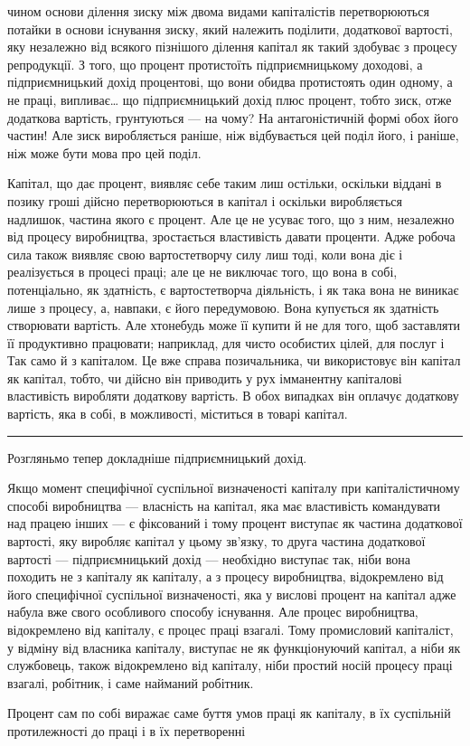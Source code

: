 \parcont{}  %
чином основи ділення зиску між двома видами капіталістів перетворюються
потайки в основи існування зиску, який належить
поділити, додаткової вартості, яку незалежно від всякого пізнішого
ділення капітал як такий здобуває з процесу репродукції.
З того, що процент протистоїть підприємницькому доходові, а
підприємницький дохід процентові, що вони обидва протистоять
один одному, а не праці, випливає\dots{} що підприємницький дохід
плюс процент, тобто зиск, отже додаткова вартість, грунтуються
— на чому? На антагоністичній формі обох його частин!
Але зиск виробляється раніше, ніж відбувається цей поділ його,
і раніше, ніж може бути мова про цей поділ.

Капітал, що дає процент, виявляє себе таким лиш остільки,
оскільки віддані в позику гроші дійсно перетворюються в капітал
і оскільки виробляється надлишок, частина якого є процент.
Але це не усуває того, що з ним, незалежно від процесу виробництва,
зростається властивість давати проценти. Адже робоча
сила також виявляє свою вартостетворчу силу лиш тоді, коли
вона діє і реалізується в процесі праці; але це не виключає того,
що вона в собі, потенціально, як здатність, є вартостетворча
діяльність, і як така вона не виникає лише з процесу, а, навпаки,
є його передумовою. Вона купується як здатність створювати
вартість. Але хтонебудь може її купити й не для того, щоб заставляти
її продуктивно працювати; наприклад, для чисто особистих
цілей, для послуг і~ Так само й з капіталом. Це вже справа
позичальника, чи використовує він капітал як капітал, тобто,
чи дійсно він приводить у рух імманентну капіталові властивість
виробляти додаткову вартість. В обох випадках він оплачує
додаткову вартість, яка в собі, в можливості, міститься в товарі
капітал.

\pfbreak

Розгляньмо тепер докладніше підприємницький дохід.

Якщо момент специфічної суспільної визначеності капіталу
при капіталістичному способі виробництва — власність на капітал,
яка має властивість командувати над працею інших — є фіксований
і тому процент виступає як частина додаткової вартості, яку
виробляє капітал у цьому зв’язку, то друга частина додаткової
вартості — підприємницький дохід — необхідно виступає так, ніби
вона походить не з капіталу як капіталу, а з процесу виробництва,
відокремлено від його специфічної суспільної визначеності,
яка у вислові процент на капітал адже набула вже
свого особливого способу існування. Але процес виробництва,
відокремлено від капіталу, є процес праці взагалі. Тому промисловий
капіталіст, у відміну від власника капіталу, виступає не
як функціонуючий капітал, а ніби як службовець, також відокремлено
від капіталу, ніби простий носій процесу праці взагалі,
робітник, і саме найманий робітник.

Процент сам по собі виражає саме буття умов праці як капіталу,
в їх суспільній протилежності до праці і в їх перетворенні
\parbreak{}  %

